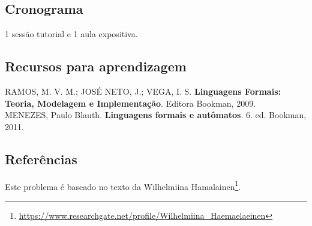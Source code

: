 \subsection{Cronograma}

1 sessão tutorial e 1 aula expositiva.

\subsection{Recursos para aprendizagem}

\noindent
RAMOS, M. V. M.; JOSÉ NETO, J.; VEGA, I. S. \textbf{Linguagens Formais: Teoria, Modelagem e Implementação}. Editora Bookman, 2009.\\

\noindent
MENEZES, Paulo Blauth. \textbf{Linguagens formais e autômatos}. 6. ed. Bookman, 2011.\\

\subsection*{Referências}

Este problema é baseado no texto da Wilhelmiina Hamalainen\footnote{\url{https://www.researchgate.net/profile/Wilhelmiina_Haemaelaeinen}}.
